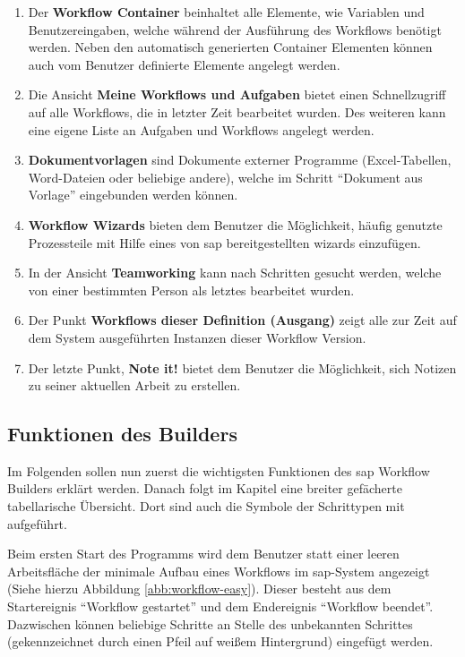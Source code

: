 \begin{enumerate}
	\item Der \textbf{Workflow Container} beinhaltet alle Elemente, wie Variablen und Benutzereingaben, welche während der Ausführung des Workflows benötigt werden. Neben den automatisch generierten Container Elementen können auch vom Benutzer definierte Elemente angelegt werden.
	\item Die Ansicht \textbf{Meine Workflows und Aufgaben} bietet einen Schnellzugriff auf alle Workflows, die in letzter Zeit bearbeitet wurden. Des weiteren kann eine eigene Liste an Aufgaben und Workflows angelegt werden.
	\item \textbf{Dokumentvorlagen} sind Dokumente externer Programme (Excel-Tabellen, Word-Dateien oder beliebige andere), welche im Schritt "`Dokument aus Vorlage"' eingebunden werden können. 
	\item \textbf{Workflow Wizards} bieten dem Benutzer die Möglichkeit, häufig genutzte Prozessteile mit Hilfe eines von \gls{sap} bereitgestellten \gls{wizard}s einzufügen.
	\item In der Ansicht \textbf{Teamworking} kann nach Schritten gesucht werden, welche von einer bestimmten Person als letztes bearbeitet wurden.
	\item Der Punkt \textbf{Workflows dieser Definition (Ausgang)} zeigt alle zur Zeit auf dem System ausgeführten Instanzen dieser Workflow Version.
	\item Der letzte Punkt, \textbf{Note it!} bietet dem Benutzer die Möglichkeit, sich Notizen zu seiner aktuellen Arbeit zu erstellen.
\end{enumerate}



\subsection{Funktionen des Builders}
\label{sec:builder-funktionen}
Im Folgenden sollen nun zuerst die wichtigsten Funktionen des \gls{sap} Workflow Builders erklärt werden. Danach folgt im Kapitel  eine breiter gefächerte tabellarische Übersicht. Dort sind auch die Symbole der Schrittypen mit aufgeführt. 

Beim ersten Start des Programms wird dem Benutzer statt einer leeren Arbeitsfläche der minimale Aufbau eines Workflows im \gls{sap}-System angezeigt (Siehe hierzu Abbildung \ref{abb:workflow-easy}). Dieser besteht aus dem Startereignis "`Workflow gestartet"' und dem Endereignis "`Workflow beendet"'. Dazwischen können beliebige Schritte an Stelle des unbekannten Schrittes (gekennzeichnet durch einen Pfeil auf weißem Hintergrund) eingefügt werden.

